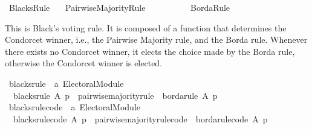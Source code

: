 %
\begin{isabellebody}%
%
%
\isadelimdocument
\isanewline
%
\endisadelimdocument
%
\isatagdocument
\isanewline
%
\isamarkuptrue%
%
\endisatagdocument
{\isafolddocument}%
%
\isadelimdocument
%
\endisadelimdocument
%
\isadelimtheory
%
\endisadelimtheory
%
\isatagtheory
{}\isamarkupfalse%
\ Blacks{\isacharunderscore}{\kern0pt}Rule\isanewline
\ \ \ Pairwise{\isacharunderscore}{\kern0pt}Majority{\isacharunderscore}{\kern0pt}Rule\isanewline
\ \ \ \ \ \ \ \ \ \ Borda{\isacharunderscore}{\kern0pt}Rule\isanewline
{}%
\endisatagtheory
{\isafoldtheory}%
%
\isadelimtheory
%
\endisadelimtheory
%
\begin{isamarkuptext}%
This is Black's voting rule. It is composed of a function that determines
the Condorcet winner, i.e., the Pairwise Majority rule, and the Borda rule.
Whenever there exists no Condorcet winner, it elects the choice made by the
Borda rule, otherwise the Condorcet winner is elected.%
\end{isamarkuptext}\isamarkuptrue%
%
\isadelimdocument
%
\endisadelimdocument
%
\isatagdocument
%
\isamarkuptrue%
%
\endisatagdocument
{\isafolddocument}%
%
\isadelimdocument
%
\endisadelimdocument
{}\isamarkupfalse%
\ blacks{\isacharunderscore}{\kern0pt}rule\ {\isacharcolon}{\kern0pt}{\isacharcolon}{\kern0pt}\ {\isachardoublequoteopen}{\isacharprime}{\kern0pt}a\ Electoral{\isacharunderscore}{\kern0pt}Module{\isachardoublequoteclose}\ \isanewline
\ \ {\isachardoublequoteopen}blacks{\isacharunderscore}{\kern0pt}rule\ A\ p\ {\isacharequal}{\kern0pt}\ {\isacharparenleft}{\kern0pt}pairwise{\isacharunderscore}{\kern0pt}majority{\isacharunderscore}{\kern0pt}rule\ {\isasymtriangleright}\ borda{\isacharunderscore}{\kern0pt}rule{\isacharparenright}{\kern0pt}\ A\ p{\isachardoublequoteclose}\isanewline
\isanewline
{}\isamarkupfalse%
\ blacks{\isacharunderscore}{\kern0pt}rule{\isacharunderscore}{\kern0pt}code\ {\isacharcolon}{\kern0pt}{\isacharcolon}{\kern0pt}\ {\isachardoublequoteopen}{\isacharprime}{\kern0pt}a\ Electoral{\isacharunderscore}{\kern0pt}Module{\isachardoublequoteclose}\ \isanewline
\ \ {\isachardoublequoteopen}blacks{\isacharunderscore}{\kern0pt}rule{\isacharunderscore}{\kern0pt}code\ A\ p\ {\isacharequal}{\kern0pt}\ {\isacharparenleft}{\kern0pt}pairwise{\isacharunderscore}{\kern0pt}majority{\isacharunderscore}{\kern0pt}rule{\isacharunderscore}{\kern0pt}code\ {\isasymtriangleright}\ borda{\isacharunderscore}{\kern0pt}rule{\isacharunderscore}{\kern0pt}code{\isacharparenright}{\kern0pt}\ A\ p{\isachardoublequoteclose}\isanewline
%
\isadelimtheory
\isanewline
%
\endisadelimtheory
%
\isatagtheory
{}\isamarkupfalse%
%
\endisatagtheory
{\isafoldtheory}%
%
\isadelimtheory
%
\endisadelimtheory
%
\end{isabellebody}%
